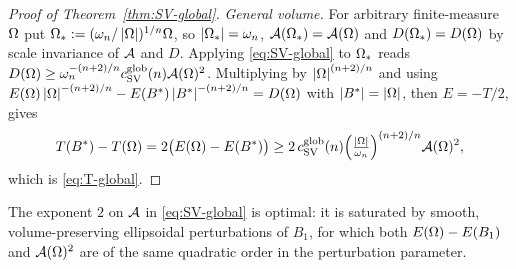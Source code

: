 \begin{proof}[Proof of Theorem~\ref{thm:SV-global}]
\emph{General volume.} For arbitrary finite-measure $\Omega$ put
$\Omega_*:=(\omega_n/\left|\Omega\right|)^{1/n}\Omega$, so $\left|\Omega_*\right|=\omega_n$,
$\mathcal A(\Omega_*)=\mathcal A(\Omega)$ and $D(\Omega_*)=D(\Omega)$ by scale invariance of
$\mathcal A$ and $D$. Applying \eqref{eq:SV-global} to $\Omega_*$ reads
$D(\Omega)\ge\omega_n^{-(n+2)/n}c_{\mathrm{SV}}^{\mathrm{glob}}(n)\mathcal A(\Omega)^2$.
Multiplying by $\left|\Omega\right|^{(n+2)/n}$ and using
$E(\Omega)\left|\Omega\right|^{-(n+2)/n}-E(B^*)\left|B^*\right|^{-(n+2)/n}=D(\Omega)$ with
$\left|B^*\right|=\left|\Omega\right|$, then $E=-T/2$, gives
\[
   T(B^*)-T(\Omega)=2\bigl(E(\Omega)-E(B^*)\bigr)
   \ge2\,c_{\mathrm{SV}}^{\mathrm{glob}}(n)
   \Bigl(\tfrac{\left|\Omega\right|}{\omega_n}\Bigr)^{(n+2)/n}\mathcal A(\Omega)^2,
\]
which is \eqref{eq:T-global}.
\end{proof}

\begin{remark}
The exponent $2$ on $\mathcal A$ in \eqref{eq:SV-global} is optimal: it is
saturated by smooth, volume-preserving ellipsoidal perturbations of
$B_1$, for which both $E(\Omega)-E(B_1)$ and $\mathcal A(\Omega)^2$ are of the same
quadratic order in the perturbation parameter.
\end{remark}

